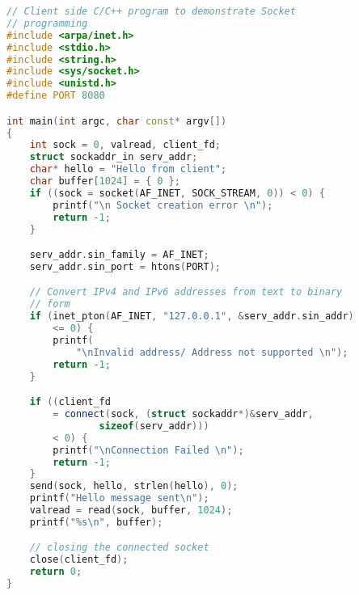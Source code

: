 \begin{lstlisting}[language=cpp, caption=client.cpp]
// Client side C/C++ program to demonstrate Socket
// programming
#include <arpa/inet.h>
#include <stdio.h>
#include <string.h>
#include <sys/socket.h>
#include <unistd.h>
#define PORT 8080

int main(int argc, char const* argv[])
{
	int sock = 0, valread, client_fd;
	struct sockaddr_in serv_addr;
	char* hello = "Hello from client";
	char buffer[1024] = { 0 };
	if ((sock = socket(AF_INET, SOCK_STREAM, 0)) < 0) {
		printf("\n Socket creation error \n");
		return -1;
	}

	serv_addr.sin_family = AF_INET;
	serv_addr.sin_port = htons(PORT);

	// Convert IPv4 and IPv6 addresses from text to binary
	// form
	if (inet_pton(AF_INET, "127.0.0.1", &serv_addr.sin_addr)
		<= 0) {
		printf(
			"\nInvalid address/ Address not supported \n");
		return -1;
	}

	if ((client_fd
		= connect(sock, (struct sockaddr*)&serv_addr,
				sizeof(serv_addr)))
		< 0) {
		printf("\nConnection Failed \n");
		return -1;
	}
	send(sock, hello, strlen(hello), 0);
	printf("Hello message sent\n");
	valread = read(sock, buffer, 1024);
	printf("%s\n", buffer);

	// closing the connected socket
	close(client_fd);
	return 0;
}
\end{lstlisting}
